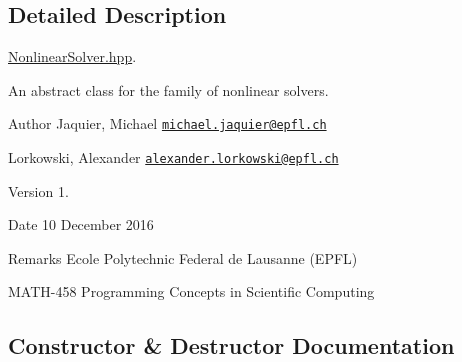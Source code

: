 \subsection{Detailed Description}
\hyperlink{_nonlinear_solver_8hpp_source}{Nonlinear\+Solver.\+hpp}. 

An abstract class for the family of nonlinear solvers. \begin{DoxyAuthor}{Author}
Jaquier, Michael \href{mailto:michael.jaquier@epfl.ch}{\tt michael.\+jaquier@epfl.\+ch} 

Lorkowski, Alexander \href{mailto:alexander.lorkowski@epfl.ch}{\tt alexander.\+lorkowski@epfl.\+ch} 
\end{DoxyAuthor}
\begin{DoxyVersion}{Version}
1. 
\end{DoxyVersion}
\begin{DoxyDate}{Date}
10 December 2016 
\end{DoxyDate}
\begin{DoxyRemark}{Remarks}
Ecole Polytechnic Federal de Lausanne (E\+P\+FL) 

M\+A\+T\+H-\/458 Programming Concepts in Scientific Computing 
\end{DoxyRemark}


\subsection{Constructor \& Destructor Documentation}
